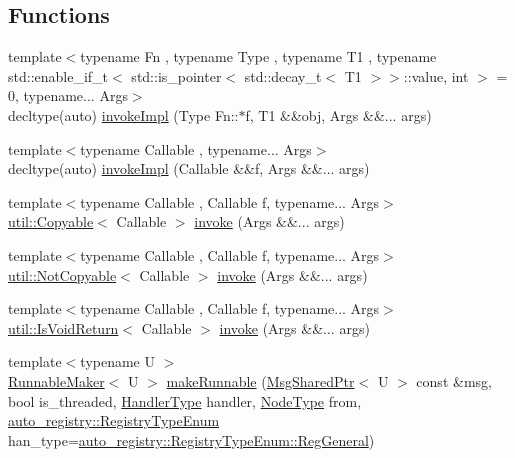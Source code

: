 \subsection*{Functions}
\begin{DoxyCompactItemize}
\item 
{\footnotesize template$<$typename Fn , typename Type , typename T1 , typename std\+::enable\+\_\+if\+\_\+t$<$ std\+::is\+\_\+pointer$<$ std\+::decay\+\_\+t$<$ T1 $>$$>$\+::value, int $>$  = 0, typename... Args$>$ }\\decltype(auto) \hyperlink{namespacevt_1_1runnable_a4253e4fa9c8c6e68da420ab440f2b298}{invoke\+Impl} (Type Fn\+::$\ast$f, T1 \&\&obj, Args \&\&... args)
\item 
{\footnotesize template$<$typename Callable , typename... Args$>$ }\\decltype(auto) \hyperlink{namespacevt_1_1runnable_af14b1c72fc3bf8437c2b89021af7eecf}{invoke\+Impl} (Callable \&\&f, Args \&\&... args)
\item 
{\footnotesize template$<$typename Callable , Callable f, typename... Args$>$ }\\\hyperlink{namespacevt_1_1util_ae9a553985cdc8e9bd4e55f55161f2929}{util\+::\+Copyable}$<$ Callable $>$ \hyperlink{namespacevt_1_1runnable_a14fa3dbf3bef4a683fc7284452b766d3}{invoke} (Args \&\&... args)
\item 
{\footnotesize template$<$typename Callable , Callable f, typename... Args$>$ }\\\hyperlink{namespacevt_1_1util_a0760a3963341a602dfe2dfc42d78c867}{util\+::\+Not\+Copyable}$<$ Callable $>$ \hyperlink{namespacevt_1_1runnable_aa86b7892ea9590c2e8fef9ed0ca4e80c}{invoke} (Args \&\&... args)
\item 
{\footnotesize template$<$typename Callable , Callable f, typename... Args$>$ }\\\hyperlink{namespacevt_1_1util_a97df3e28837417537b3bc035c74f064d}{util\+::\+Is\+Void\+Return}$<$ Callable $>$ \hyperlink{namespacevt_1_1runnable_ad7a4c11af0d8864939dca87f89fba1cb}{invoke} (Args \&\&... args)
\item 
{\footnotesize template$<$typename U $>$ }\\\hyperlink{structvt_1_1runnable_1_1_runnable_maker}{Runnable\+Maker}$<$ U $>$ \hyperlink{namespacevt_1_1runnable_aade55dc0d7ad5a73d2ff54e68ddfcea5}{make\+Runnable} (\hyperlink{namespacevt_ab2b3d506ec8e8d1540aede826d84a239}{Msg\+Shared\+Ptr}$<$ U $>$ const \&msg, bool is\+\_\+threaded, \hyperlink{namespacevt_af64846b57dfcaf104da3ef6967917573}{Handler\+Type} handler, \hyperlink{namespacevt_a866da9d0efc19c0a1ce79e9e492f47e2}{Node\+Type} from, \hyperlink{namespacevt_1_1auto__registry_a9f369ca2b484130b396729e2ddf05241}{auto\+\_\+registry\+::\+Registry\+Type\+Enum} han\+\_\+type=\hyperlink{namespacevt_1_1auto__registry_a9f369ca2b484130b396729e2ddf05241aed767d8e868d24805af30efeb716d412}{auto\+\_\+registry\+::\+Registry\+Type\+Enum\+::\+Reg\+General})

\end{DoxyCompactItemize}
